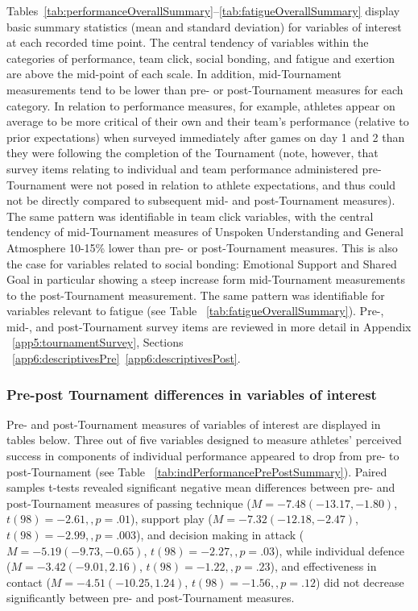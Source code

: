 Tables~\ref{tab:performanceOverallSummary}\nobreakdash--\ref{tab:fatigueOverallSummary} display basic summary statistics (mean and standard deviation) for variables of interest at each recorded time point. The central tendency of variables within the categories of performance, team click, social bonding, and fatigue and exertion are above the mid-point of each scale. In addition, mid-Tournament measurements tend to be lower than pre- or post-Tournament measures for each category. In relation to performance measures, for example, athletes appear on average to be more critical of their own and their team’s performance (relative to prior expectations) when surveyed immediately after games on day 1 and 2 than they were following the completion of the Tournament (note, however, that survey items relating to individual and team performance administered pre-Tournament were not posed in relation to athlete expectations, and thus could not be directly compared to subsequent mid- and post-Tournament measures). The same pattern was identifiable in team click variables, with the central tendency of mid-Tournament measures of Unspoken Understanding and General Atmosphere 10-15\% lower than pre- or post-Tournament measures. This is also the case for variables related to social bonding: Emotional Support and Shared Goal in particular showing a steep increase form mid-Tournament measurements to the post-Tournament measurement. The same pattern was identifiable for variables relevant to fatigue (see Table ~\ref{tab:fatigueOverallSummary}).
Pre-, mid-, and post-Tournament survey items are reviewed in more detail in Appendix ~\ref{app5:tournamentSurvey}, Sections ~\ref{app6:descriptivesPre}\nobreakdash~\ref{app6:descriptivesPost}.







\subsubsection{Pre-post Tournament differences in variables of interest}
Pre- and post-Tournament measures of variables of interest are displayed in tables below.  Three out of five variables designed to measure athletes' perceived success in components of individual performance appeared to drop from pre- to post-Tournament (see Table ~\ref{tab:indPerformancePrePostSummary}).  Paired samples t-tests revealed significant negative mean differences between pre- and post-Tournament measures of passing technique ($M = -7.48 (-13.17, -1.80)$, $t(98)= -2.61,, p = .01$), support play ($M = -7.32 (-12.18, -2.47)$, $t(98)= -2.99,, p = .003$), and decision making in attack ($M = -5.19 ( -9.73, -0.65)$, $t(98)= -2.27,, p = .03$), while individual defence ($M = -3.42 (-9.01, 2.16)$, $t(98)= -1.22,, p = .23$), and effectiveness in contact ($M = -4.51 (-10.25, 1.24)$, $t(98)= -1.56,, p = .12$) did not decrease significantly between pre- and post-Tournament measures.

